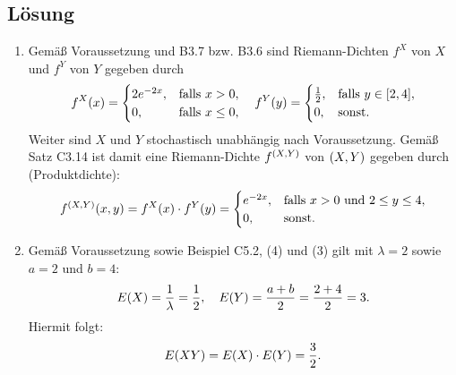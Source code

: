 \documentclass{exercise}
\begin{document}
    \subsection*{Lösung}
    \begin{enumerate}
        \item Gemäß Voraussetzung und B3.7 bzw. B3.6 sind Riemann-Dichten \(f^X\) von \(X\) und \(f^Y\) von \(Y\) gegeben durch
        \[
            f^X\parentheses*{x} = \begin{cases}
                2e^{-2x}, & \text{falls }x > 0,\\
                0, & \text{falls }x \le 0,
            \end{cases} \quad f^Y\parentheses*{y} = \begin{cases}
                \frac{1}{2}, & \text{falls }y \in \brackets*{2, 4},\\
                0, & \text{sonst}.
            \end{cases}
        \]
        Weiter sind \(X\) und \(Y\) stochastisch unabhängig nach Voraussetzung.
        Gemäß Satz C3.14 ist damit eine Riemann-Dichte \(f^{\parentheses*{X, Y}}\) von \(\parentheses*{X, Y}\) gegeben durch (Produktdichte):
        \[
            f^{\parentheses*{X, Y}}\parentheses*{x, y} = f^X\parentheses*{x} \cdot f^{Y}\parentheses*{y} = \begin{cases}
                e^{-2x}, & \text{falls }x > 0\text{ und }2 \le y \le 4,\\
                0, & \text{sonst}.
            \end{cases}
        \]
        \item Gemäß Voraussetzung sowie Beispiel C5.2, (4) und (3) gilt mit \(\lambda = 2\) sowie \(a = 2\) und \(b = 4\):
        \[
            E\parentheses*{X} = \frac{1}{\lambda} = \frac{1}{2}, \quad E\parentheses*{Y} = \frac{a + b}{2} = \frac{2 + 4}{2} = 3.
        \]
        Hiermit folgt:
        \[
            E\parentheses*{XY} = E\parentheses*{X} \cdot E\parentheses*{Y} = \frac{3}{2}.
        \]
    \end{enumerate}
\end{document}

